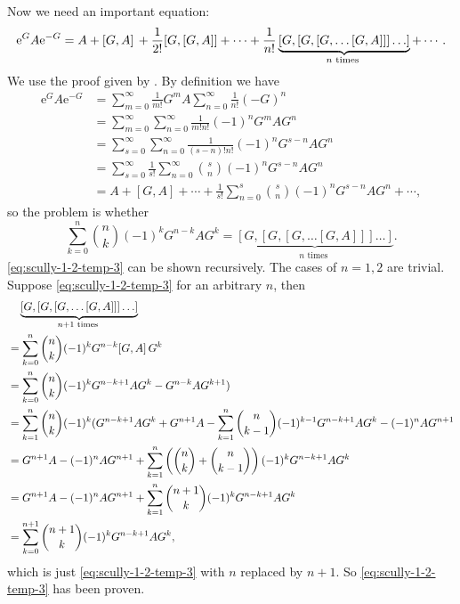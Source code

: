 \documentclass[hyperref, a4paper]{article}
\newcommand*{\ee}{\mathrm{e}}
\begin{document}
Now we need an important equation:
\begin{equation}
    \ee^{G} A \ee^{-G} = A + \comm*{G}{A} + \frac{1}{2!} [G, [G, A]] + \cdots + \frac{1}{n!} \underbrace{[G,[G,[G, \ldots[G, A]]] \ldots]}_{n \text { times }} + \cdots. 
    \label{eq:scully-1-2-temp-4}
\end{equation}
We use the proof given by \cite{711309}. By definition we have
\[
    \begin{aligned}
        \ee^{G} A \ee^{-G} &= \sum_{m=0}^\infty \frac{1}{m!} G^m A \sum_{n=0}^\infty \frac{1}{n!} (-G)^n \\
        &= \sum_{m=0}^\infty \sum_{n=0}^\infty \frac{1}{m! n!} (-1)^n G^m A G^n \\
        &= \sum_{s=0}^\infty \sum_{n=0}^\infty \frac{1}{(s-n)! n!} (-1)^n G^{s-n} A G^n \\
        &= \sum_{s=0}^\infty \frac{1}{s!} \sum_{n=0}^\infty \binom{s}{n} (-1)^n G^{s-n} A G^n \\
        &= A + [G, A] + \cdots + \frac{1}{s!} \sum_{n=0}^s \binom{s}{n} (-1)^n G^{s-n} A G^n + \cdots,
    \end{aligned}
\]
so the problem is whether 
\begin{equation}
    \sum_{k=0}^n \binom{n}{k} (-1)^k G^{n-k} A G^k =  \underbrace{[G,[G,[G, \ldots[G, A]]] \ldots]}_{n \text { times }}.
    \label{eq:scully-1-2-temp-3}
\end{equation}
\eqref{eq:scully-1-2-temp-3} can be shown recursively. The cases of $n=1, 2$ are trivial. Suppose \eqref{eq:scully-1-2-temp-3} for an arbitrary $n$, then 
\[
    \begin{aligned}
        &\quad \underbrace{[G,[G,[G, \ldots[G, A]]] \ldots]}_{n+1 \text { times }} \\
        &= \sum_{k=0}^n \binom{n}{k} (-1)^k G^{n-k} \comm*{G}{A} G^k \\
        &= \sum_{k=0}^n \binom{n}{k} (-1)^k G^{n-k + 1} A G^k - G^{n-k} A G^{k+1}) \\
        &= \sum_{k=1}^n \binom{n}{k} (-1)^k (G^{n-k + 1} A G^k + G^{n+1} A - \sum_{k=1}^n \binom{n}{k-1} (-1)^{k-1} G^{n - k+1} A G^k - (-1)^n A G^{n+1} \\
        &= G^{n+1} A - (-1)^n A G^{n+1} + \sum_{k=1}^n \left( \binom{n}{k} + \binom{n}{k-1} \right) (-1)^k G^{n-k + 1} A G^k \\
        &=  G^{n+1} A - (-1)^n A G^{n+1} + \sum_{k=1}^n \binom{n+1}{k} (-1)^k G^{n-k + 1} A G^k \\
        &= \sum_{k=0}^{n+1} \binom{n+1}{k} (-1)^k G^{n-k + 1} A G^k ,
    \end{aligned}
\]
which is just \eqref{eq:scully-1-2-temp-3} with $n$ replaced by $n+1$.
So \eqref{eq:scully-1-2-temp-3} has been proven.
\end{document}
